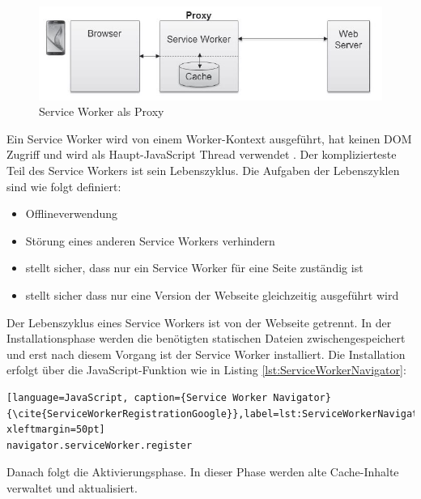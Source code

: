 \begin{figure}[h]
	\centering
	\includegraphics[width=14cm]{BilderAllgemein/SWProxy}\medskip
	\caption{Service Worker als Proxy \cite{SWProxy}}
	\label{fig:SWProxy}
\end{figure}

Ein Service Worker wird von einem Worker-Kontext ausgeführt, hat keinen DOM Zugriff und wird als Haupt-JavaScript Thread verwendet \cite{Worker} \cite{ServiceWorker}.
Der komplizierteste Teil des Service Workers ist sein Lebenszyklus. 
\newpage
Die Aufgaben der Lebenszyklen sind wie folgt definiert:

\begin{itemize}
    \item  Offlineverwendung
	\item  Störung eines anderen Service Workers verhindern
	\item  stellt sicher, dass nur ein Service Worker für eine Seite zuständig ist
	\item  stellt sicher dass nur eine Version der Webseite gleichzeitig ausgeführt wird
\end{itemize}


Der Lebenszyklus eines Service Workers ist von der Webseite getrennt.
In der Installationsphase werden die benötigten statischen Dateien zwischengespeichert und erst nach diesem Vorgang ist der Service Worker installiert. Die Installation erfolgt über die JavaScript-Funktion wie in Listing \ref{lst:ServiceWorkerNavigator}:

\begin{lstlisting}[language=JavaScript, caption={Service Worker Navigator} {\cite{ServiceWorkerRegistrationGoogle}},label=lst:ServiceWorkerNavigator, xleftmargin=50pt]
navigator.serviceWorker.register
\end{lstlisting}

Danach folgt die Aktivierungsphase. In dieser Phase werden alte Cache-Inhalte verwaltet und aktualisiert.





